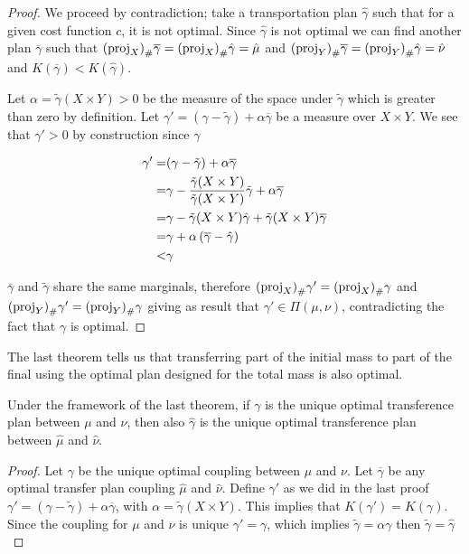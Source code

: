 \begin{proof}
	We proceed by contradiction; take a transportation plan $\hat \gamma$ such that  for a given cost function $c$, it is not optimal. Since $\hat \gamma$ is not optimal we can find another plan $\overline \gamma$ such that $\Tmeasure{\overline \gamma}{(\proj_X)}=\Tmeasure{\hat \gamma}{(\proj_X)}=\hat \mu$ and $\Tmeasure{\overline \gamma}{(\proj_Y)}=\Tmeasure{\hat \gamma}{(\proj_Y)}=\hat \nu$ and $K(\overline\gamma)<K(\hat \gamma)$.
	
	Let $\alpha=\tilde\gamma(X\times Y)>0$ be the measure of the space under $\tilde{\gamma}$ which is greater than zero by definition. Let $\gamma' = (\gamma-\tilde\gamma) + \alpha\overline{\gamma}$ be a measure over $X\times Y$. We see that 
	$\gamma'>0$ by construction since $\gamma$
	
	\begin{align*}
	\gamma' =& (\gamma-\tilde\gamma) + \alpha\overline{\gamma} \\
	=&\gamma-\frac{\tilde{\gamma}(X\times Y)}{\tilde{\gamma}(X\times Y)}\tilde\gamma + \alpha\overline{\gamma} \\
	=& \gamma-\tilde{\gamma}(X\times Y)\hat{\gamma} +\tilde\gamma(X\times Y)\overline{\gamma} \\
	=&\gamma+\alpha\parentheses{\overline{\gamma}-\hat{\gamma}}\\
	<&\gamma
	\end{align*}
	
	$\overline \gamma$ and $\tilde \gamma$ share the same marginals, therefore $\Tmeasure{\gamma'}{(\proj_X)}=\Tmeasure{\gamma}{(\proj_X)}$ and 
	$\Tmeasure{\gamma'}{(\proj_Y)}=\Tmeasure{\gamma}{(\proj_Y)}$ giving as result that $\gamma' \in \Pi(\mu, \nu)$, contradicting the fact that $\gamma$ is optimal.
\end{proof}
The last theorem tells us that transferring part of the initial mass to part of the final using the optimal plan designed for the total mass is also optimal. 
\begin{corollary}
	Under the framework of the last theorem, if $\gamma$ is the unique optimal transference plan between $\mu$ and $\nu$, then also $\hat\gamma$ is the unique optimal transference plan between $\hat\mu$ and $\hat\nu$.
\end{corollary}

\begin{proof}
	Let $\gamma$ be the unique optimal coupling between $\mu$ and $\nu$. Let $\overline\gamma$ be any optimal transfer plan coupling $\hat{\mu}$ and $\hat{\nu}$. Define $\gamma'$ as we did in the last proof $\gamma'=(\gamma-\tilde{\gamma})+\alpha\overline{\gamma}$, with $\alpha=\tilde\gamma(X\times Y)$. This implies that $K(\gamma')=K(\gamma)$. Since the coupling for $\mu$ and $\nu$ is unique $\gamma'=\gamma$, which implies $\tilde\gamma=\alpha\gamma$ then $\tilde{\gamma}=\hat{\gamma}$ 
\end{proof}

